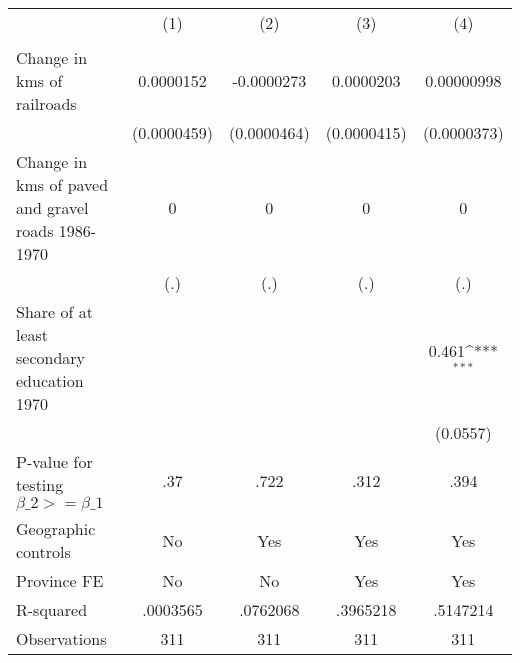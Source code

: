 {
\def\sym#1{\ifmmode^{#1}\else\(^{#1}\)\fi}
\begin{tabular}{l*{4}{c}}
\hline\hline
                &\multicolumn{1}{c}{(1)}&\multicolumn{1}{c}{(2)}&\multicolumn{1}{c}{(3)}&\multicolumn{1}{c}{(4)}\\
                &\multicolumn{1}{c}{}&\multicolumn{1}{c}{}&\multicolumn{1}{c}{}&\multicolumn{1}{c}{}\\
\hline
Change in kms of railroads&0.0000152         &-0.0000273         &0.0000203         &0.00000998         \\
                &(0.0000459)         &(0.0000464)         &(0.0000415)         &(0.0000373)         \\
[1em]
Change in kms of paved and gravel roads 1986-1970&        0         &        0         &        0         &        0         \\
                &      (.)         &      (.)         &      (.)         &      (.)         \\
[1em]
Share of at least secondary education 1970&                  &                  &                  &    0.461\sym{***}\\
                &                  &                  &                  & (0.0557)         \\
\hline
P-value for testing $\beta\_{2} >= \beta\_{1}$&      .37         &     .722         &     .312         &     .394         \\
Geographic controls&       No         &      Yes         &      Yes         &      Yes         \\
Province FE     &       No         &       No         &      Yes         &      Yes         \\
R-squared       & .0003565         & .0762068         & .3965218         & .5147214         \\
Observations    &      311         &      311         &      311         &      311         \\
\hline\hline
\end{tabular}
}
